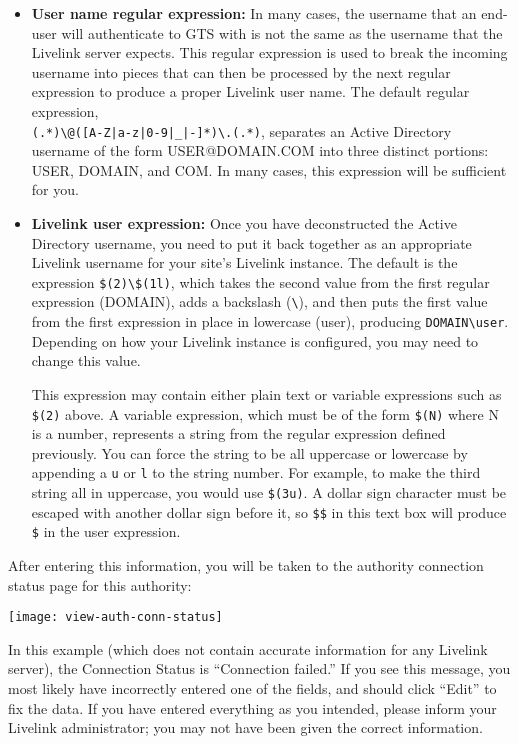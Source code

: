 \begin{itemize}

\label{regex}
\item \textbf{User name regular expression:} In many cases, the username
that an end-user will authenticate to GTS with is not the same as the
username that the Livelink server expects. This regular expression is used
to break the incoming username into pieces that can then be processed by
the next regular expression to produce a proper Livelink user name. The
default regular expression, \\ \verb+(.*)\@([A-Z|a-z|0-9|_|-]*)\.(.*)+,
separates an Active Directory \\ username of the form USER@DOMAIN.COM
into three distinct portions: USER, DOMAIN, and COM. In many cases,
this expression will be sufficient for you.


\item \textbf{Livelink user expression:} Once you have deconstructed
the Active Directory username, you need to put it back together as an
appropriate Livelink username for your site's Livelink instance. The
default is the expression \verb+$(2)\$(1l)+, which takes the second value
from the first regular expression (DOMAIN), adds a backslash
(\verb+\+), and then puts the first value from the first expression in
place in lowercase (user), producing \verb+DOMAIN\user+. Depending on
how your Livelink instance is configured, you may need to change this
value. 

This expression may contain either plain text or variable expressions
such as \verb+$(2)+ above.  A variable expression, which must be of
the form \verb+$(N)+ where N is a number, represents a string from the
regular expression defined previously. You can force the string to be
all uppercase or lowercase by appending a \verb+u+ or \verb+l+ to the
string number. For example, to make the third string all in uppercase,
you would use \verb+$(3u)+. A dollar sign character must be escaped
with another dollar sign before it, so \verb+$$+ in this text box will
produce \verb+$+ in the user expression.

\end{itemize}

After entering this information, you will be taken to the authority
connection status page for this authority:

\texttt{[image: view-auth-conn-status]}

In this example (which does not contain accurate information for any
Livelink server), the Connection Status is ``Connection failed.''
If you see this message, you most likely have incorrectly entered one
of the fields, and should click ``Edit'' to fix the data. If you have
entered everything as you intended, please inform your Livelink administrator;
you may not have been given the correct information.

